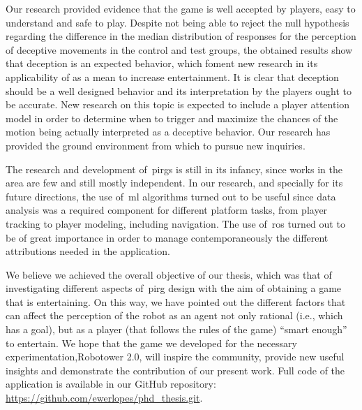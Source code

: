 Our research provided evidence that the game is well accepted by players, easy to understand and safe to play. Despite not being able to reject the null hypothesis regarding the difference in the median distribution of responses for the perception of deceptive movements in the control and test groups, the obtained results show that deception is an expected behavior, which foment new research in its applicability of as a mean to increase entertainment. It is clear that deception should be a well designed behavior and its interpretation by the players ought to be accurate. New research on this topic is expected to include a player attention model in order to determine when to trigger and maximize the chances of the motion being actually interpreted as a deceptive behavior. Our research has provided the ground environment from which to pursue new inquiries.

The research and development of~\gls{pirg}s is still in its infancy, since works in the area are few and still mostly independent. In our research, and specially for its future directions, the use of~\gls{ml} algorithms turned out to be useful since data analysis was a required component for different platform tasks, from player tracking to player modeling, including navigation. The use of~\gls{ros} turned out to be of great importance in order to manage contemporaneously the different attributions needed in the application.

We believe we achieved the overall objective of our thesis, which was that of investigating different aspects of~\gls{pirg} design with the aim of obtaining a game that is entertaining. On this way, we have pointed out the different factors that can affect the perception of the robot as an agent not only rational (i.e., which has a goal), but as a player (that follows the rules of the game) ``smart enough'' to entertain. We hope that the game we developed for the necessary experimentation,\ie Robotower 2.0, will inspire the community, provide new useful insights and demonstrate the contribution of our present work. Full code of the application is available in our GitHub repository: \url{https://github.com/ewerlopes/phd_thesis.git}.

